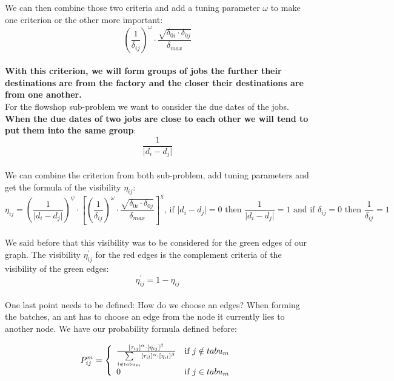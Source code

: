 \documentclass[UTF8, twoside]{EPURapport}
\begin{document}
	We can then combine those two criteria and add a tuning parameter $\omega$ to make one criterion or the other more important: 
\\

\[
\left(\frac{1}{\delta_{ij}}\right)^\omega \cdot \frac{\sqrt{\delta_{0i} \cdot \delta_{0j}}}{\delta_{max}}
\]
\\

\textbf{With this criterion, we will form groups of jobs the further their destinations are from the factory and the closer their destinations are from one another.}
\\

	For the flowshop sub-problem we want to consider the due dates of the jobs. \textbf{When the due dates of two jobs are close to each other we will tend to put them into the same group}: 
\\

\[
\frac{1}{\vert d_i - d_j \vert}
\]
\\

	We can combine the criterion from both sub-problem, add tuning parameters and get the formula of the visibility $\eta_{ij}$:
\\

\[
\eta_{ij} = 
\left( \frac{1}{\vert d_i - d_j \vert} \right)^\psi \cdot \left[\left(\frac{1}{\delta_{ij}}\right)^\omega \cdot \frac{\sqrt{\delta_{0i} \cdot \delta_{0j}}}{\delta_{max}} \right]^\chi \text{, if } \vert d_i - d_j \vert = 0 \text{ then } \frac{1}{\vert d_i - d_j \vert} = 1 \text{ and if } \delta_{ij} = 0 \text{ then } \frac{1}{\delta_{ij}} = 1
\]
\\

	We said before that this visibility was to be considered for the green edges of our graph. The visibility $\eta_{ij}^{'}$ for the red edges is the complement criteria of the visibility of the green edges:
\\

\[
\eta_{ij}^{'} = 1 - \eta_{ij}
\]
\\
	
	One last point needs to be defined: How do we choose an edges? When forming the batches, an ant has to choose an edge from the node it currently lies to another node. We have our probability formula defined before:
	
\[
P^m_{ij}= \left\{ 
\begin{array}{l r}
\frac{[\tau_{ij}]^\alpha \cdot [\eta_{ij}]^\beta}{\underset{l\notin tabu_m}{\sum}[\tau_{il}]^\alpha \cdot [\eta_{il}]^\beta} & \text{if } j\notin tabu_m\\
0 & \text{if } j\in tabu_m
\end{array}
\right.
\]
	
\end{document}
